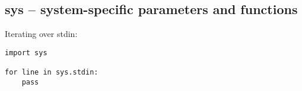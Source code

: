 \subsection{sys -- system-specific parameters and functions}
Iterating over stdin:
\begin{verbatim}
import sys

for line in sys.stdin:
    pass
\end{verbatim}

